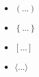\documentclass{article}
\begin{document}
  \begin{itemize}
    \item $\left( ... \right)$
    \item $\left\{ ... \right\}$
    \item $\left[ ... \right]$
    \item $\langle ... \rangle$
  \end{itemize}
\end{document}
